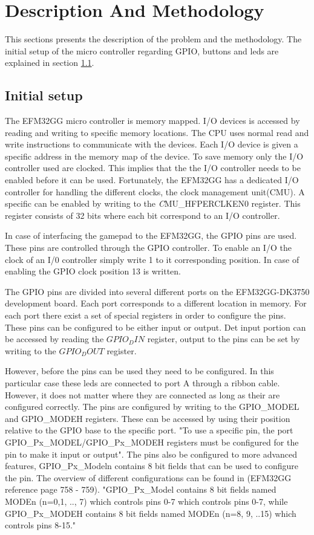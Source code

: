 \section{Description And Methodology}
This sections presents the description of the problem and the methodology. The initial setup of the micro controller regarding GPIO, buttons and leds are explained in section \ref{ch:initial_setup}. 




\subsection{Initial setup} \label{ch:initial_setup}
The EFM32GG micro controller is memory mapped. I/O devices is accessed by reading and writing to specific memory locations. The CPU uses normal read and write instructions to communicate with the devices. Each I/O device is given a specific address in the memory map of the device. To save memory only the I/O controller used are clocked. This implies that the the I/O controller needs to be enabled before it can be used. Fortunately, the EFM32GG has a dedicated I/O controller for handling the different clocks, the clock management unit(CMU). A specific can be enabled by writing to the \emph CMU\_HFPERCLKEN0 register. This register consists of 32 bits where each bit correspond to an I/O controller. 

In case of interfacing the gamepad to the EFM32GG, the GPIO pins are used. These pins are controlled through the GPIO controller. To enable an I/O the clock of an I/0 controller simply write 1 to it corresponding position. In case of enabling the GPIO clock position 13 is written. 

The GPIO pins are divided into several different ports on the EFM32GG-DK3750 development board. Each port corresponds to a different location in memory. For each port there exist a set of special registers in order to configure the pins. These pins can be configured to be either input or output. Det input portion can be accessed by reading the $GPIO_DIN$ register, output to the pins can be set by writing to the $GPIO_DOUT$ register. 

However, before the pins can be used they need to be configured. In this particular case these leds are connected to port A through a ribbon cable. However, it does not matter where they are connected as long as their are configured correctly. The pins are configured by writing to the GPIO\_MODEL and GPIO\_MODEH registers. These can be accessed by using their position relative to the GPIO base to the specific port. "To use a specific pin, the port GPIO\_Px\_MODEL/GPIO\_Px\_MODEH registers must be configured for the pin to make it input or output". The pins also be configured to more advanced features, GPIO\_Px\_Modeln contains 8 bit fields that can be used to configure the pin. The overview of different configurations can be found in (EFM32GG reference page 758 - 759). "GPIO\_Px\_Model contains 8 bit fields named MODEn (n=0,1, .., 7) which controls pins 0-7 which controls pins 0-7, while GPIO\_Px\_MODEH contains 8 bit fields named MODEn (n=8, 9, ..15) which controls pins 8-15."  

